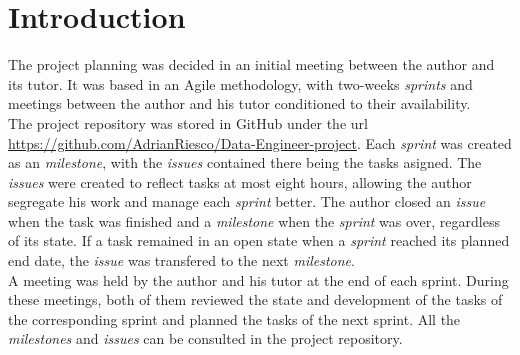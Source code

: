 
\section{Introduction}
\nonzeroparskip The project planning was decided in an initial meeting between the author and its tutor. It was based in an Agile methodology, with two-weeks \textit{sprints} and meetings between the author and his tutor conditioned to their availability.\\

\nonzeroparskip The project repository was stored in GitHub under the url \url{https://github.com/AdrianRiesco/Data-Engineer-project}. Each \textit{sprint} was created as an \textit{milestone}, with the \textit{issues} contained there being the tasks asigned. The \textit{issues} were created to reflect tasks at most eight hours, allowing the author segregate his work and manage each \textit{sprint} better. The author closed an \textit{issue} when the task was finished and a \textit{milestone} when the \textit{sprint} was over, regardless of its state. If a task remained in an open state when a \textit{sprint} reached its planned end date, the \textit{issue} was transfered to the next \textit{milestone}.\\

\nonzeroparskip A meeting was held by the author and his tutor at the end of each sprint. During these meetings, both of them reviewed the state and development of the tasks of the corresponding sprint and planned the tasks of the next sprint. All the \textit{milestones} and \textit{issues} can be consulted in the project repository.\\

